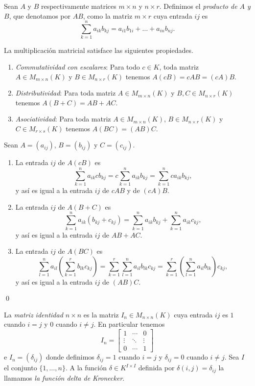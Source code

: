 \begin{defn}
Sean $A$ y $B$ respectivamente matrices $m\times n$ y $n\times r$. Definimos el \emph{producto de $A$ y $B$}, que denotamos por $AB$, como la matriz $m\times r$ cuya entrada $ij$ es
$$\sum_{k=1}^n a_{ik}b_{kj}=a_{i1}b_{1i}+\ldots+a_{in}b_{nj}.$$
\end{defn}

\begin{pro}
La multiplicaci\'on matricial satisface las siguientes propiedades.
\begin{enumerate}
\item \emph{Commutatividad con escalares}: Para todo $c\in K$, toda matriz $A\in M_{m\times n}(K)$ y $B\in M_{n\times r}(K)$ tenemos $A(cB)=cAB=(cA)B$.
\item \emph{Distributividad}: Para toda matriz $A\in M_{m\times n}(K)$ y $B,C\in M_{n\times r}(K)$ tenemos $A(B+C)=AB+AC$.
\item \emph{Asociatividad}: Para toda matriz $A\in M_{m\times n}(K)$, $B\in M_{n\times r}(K)$ y $C\in M_{r\times s}(K)$ tenemos $A(BC)=(AB)C$.
\end{enumerate}
\end{pro}

\dem Sean $A=(a_{ij})$, $B=(b_{ij})$ y $C=(c_{ij})$.
\begin{enumerate}
\item La entrada $ij$ de $A(cB)$ es
$$\sum_{k=1}^n a_{ik}cb_{kj}=c\sum_{k=1}^n a_{ik}b_{kj}=\sum_{k=1}^n ca_{ik}b_{kj},$$
y as\'i es igual a la entrada $ij$ de $cAB$ y de $(cA)B$.
\item La entrada $ij$ de $A(B+C)$ es
$$\sum_{k=1}^n a_{ik}(b_{kj}+c_{kj})=\sum_{k=1}^n a_{ik}b_{kj}+\sum_{k=1}^n a_{ik}c_{kj},$$
y as\'i es igual a la entrada $ij$ de $AB+AC$.
\item La entrada $ij$ de $A(BC)$ es
$$\sum_{l=1}^n a_{il}\left(\sum_{k=1}^r b_{lk}c_{kj}\right) = \sum_{k=1}^r\sum_{l=1}^n a_{il}b_{lk}c_{kj} = \sum_{k=1}^r\left(\sum_{l=1}^n a_{il}b_{lk}\right)c_{kj},$$
y as\'i es igual a la entrada $ij$ de $(AB)C$.
\end{enumerate}
\qed

\begin{defn}
La \emph{matriz identidad $n\times n$} es la matriz $I_n\in M_{n\times n}(K)$ cuya entrada $ij$ es $1$ cuando $i=j$ y $0$ cuando $i\ne j$. En particular tenemos
$$I_n=\left[\begin{array}{ccc}
1 & \cdots & 0\\
\vdots & \ddots & \vdots\\
0 & \cdots & 1
\end{array}\right]$$
e $I_n=(\delta_{ij})$ donde definimos $\delta_{ij}=1$ cuando $i=j$ y $\delta_{ij}=0$ cuando $i\ne j$. Sea $I$ el conjunto $\{1,\ldots,n\}$. A la funci\'on $\delta\in K^{I\times I}$ definida por $\delta(i,j)=\delta_{ij}$ la llamamos \emph{la funci\'on delta de Kronecker}.  
\end{defn}

